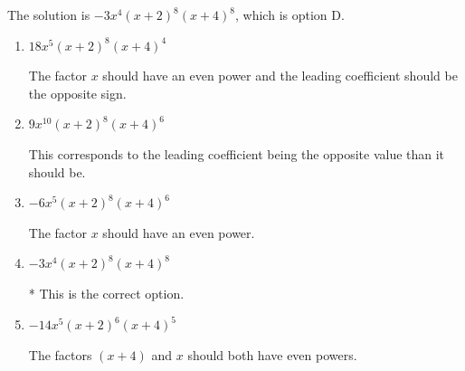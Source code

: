 \documentclass{extbook}[14pt]
\begin{document}
\begin{enumerate}
{The solution is \( -3x^{4} (x + 2)^{8} (x + 4)^{8} \), which is option D.\begin{enumerate}[label=\Alph*.]
\item \( 18x^{5} (x + 2)^{8} (x + 4)^{4} \)

The factor $x$ should have an even power and the leading coefficient should be the opposite sign.
\item \( 9x^{10} (x + 2)^{8} (x + 4)^{6} \)

This corresponds to the leading coefficient being the opposite value than it should be.
\item \( -6x^{5} (x + 2)^{8} (x + 4)^{6} \)

The factor $x$ should have an even power.
\item \( -3x^{4} (x + 2)^{8} (x + 4)^{8} \)

* This is the correct option.
\item \( -14x^{5} (x + 2)^{6} (x + 4)^{5} \)

The factors $(x + 4)$ and $x$ should both have even powers.
\end{enumerate}

}
\end{enumerate}
\end{document}
